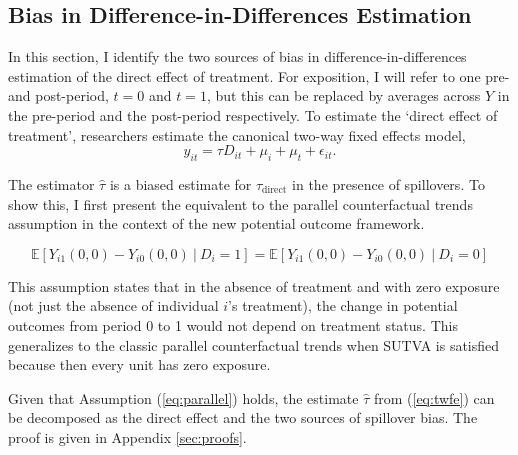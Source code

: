 \documentclass[11pt]{article}
\begin{document}
\subsection{Bias in Difference-in-Differences Estimation}

In this section, I identify the two sources of bias in difference-in-differences estimation of the direct effect of treatment. For exposition, I will refer to one pre- and post-period, $t = 0$ and $t = 1$, but this can be replaced by averages across $Y$ in the pre-period and the post-period respectively. To estimate the `direct effect of treatment', researchers estimate the canonical two-way fixed effects model, 
\begin{equation}\label{eq:twfe}    
    y_{it} = \tau D_{it} + \mu_i + \mu_t + \epsilon_{it}.
\end{equation}

The estimator $\hat{\tau}$ is a biased estimate for $\tau_{\text{direct}}$ in the presence of spillovers. To show this, I first present the equivalent to the parallel counterfactual trends assumption in the context of the new potential outcome framework. 

\begin{assumption}\label{eq:parallel}
    \[ 
        \mathbb{E}\left[ Y_{i1}(0, 0) - Y_{i0}(0, 0) \ \vert \ D_i = 1 \right] = 
        \mathbb{E}\left[ Y_{i1}(0, 0) - Y_{i0}(0, 0) \ \vert \ D_i = 0 \right]
    \]
\end{assumption}
This assumption states that in the absence of treatment and with zero exposure (not just the absence of individual $i$'s treatment), the change in potential outcomes from period 0 to 1 would not depend on treatment status. This generalizes to the classic parallel counterfactual trends when SUTVA is satisfied because then every unit has zero exposure.

Given that Assumption (\ref{eq:parallel}) holds, the estimate $\hat{\tau}$ from (\ref{eq:twfe}) can be decomposed as the direct effect and the two sources of spillover bias. The proof is given in Appendix \ref{sec:proofs}.
\end{document}
